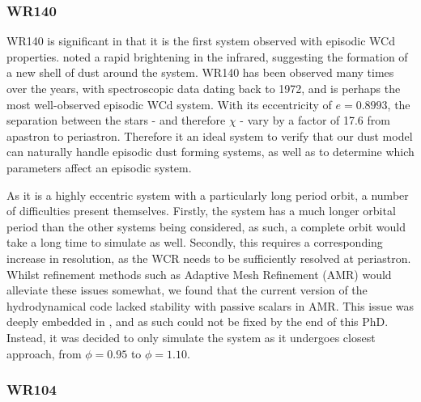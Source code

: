 \subsubsection{WR140}

WR140 is significant in that it is the first system observed with episodic WCd properties.
\textcite{williamsCondensationShellHD1978} noted a rapid brightening in the infrared, suggesting the formation of a new shell of dust around the system.
WR140 has been observed many times over the years, with spectroscopic data dating back to 1972, and is perhaps the most well-observed episodic WCd system.
With its eccentricity of $e=0.8993$, the separation between the stars - and therefore $\chi$ - vary by a factor of 17.6 from apastron to periastron.
Therefore it an ideal system to verify that our dust model can naturally handle episodic dust forming systems, as well as to determine which parameters affect an episodic system.

As it is a highly eccentric system with a particularly long period orbit, a number of difficulties present themselves.
Firstly, the system has a much longer orbital period than the other systems being considered, as such, a complete orbit would take a long time to simulate as well.
Secondly, this requires a corresponding increase in resolution, as the WCR needs to be sufficiently resolved at periastron.
Whilst refinement methods such as Adaptive Mesh Refinement (AMR) would alleviate these issues somewhat, we found that the current version of the \athena{} hydrodynamical code lacked stability with passive scalars in AMR.
This issue was deeply embedded in \athena{}, and as such could not be fixed by the end of this PhD.
Instead, it was decided to only simulate the system as it undergoes closest approach, from $\phi = 0.95$ to $\phi = 1.10$. 

\subsubsection{WR104}

